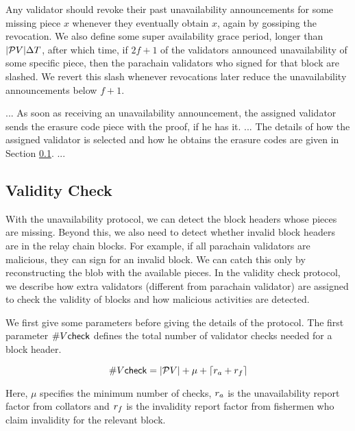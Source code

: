 Any validator should revoke their past unavailability announcements for some missing piece $x$ whenever they eventually obtain $x$, again by gossiping the revocation.  We also define some super availability grace period, longer than $|\mathcal{P}V| \Delta T$, after which time, if $2 f + 1$ of the validators announced unavailability of some specific piece, then the parachain validators who signed for that block are slashed.
We revert this slash whenever revocations later reduce the unavailability announcements below $f+1$.

...
As soon as receiving an unavailability announcement, the assigned validator sends the erasure code piece with the proof, if he has it. 
...
The details of how the assigned validator is selected and how he obtains the erasure codes are given in Section \ref{sec:validitycheck}. 
...



\subsection{Validity Check}
\label{sec:validitycheck}
With the unavailability protocol, we can detect the block headers whose pieces are missing. Beyond this, we also need to detect whether invalid block headers are in the relay chain blocks. For example, if all parachain validators are malicious, they can sign for an invalid block. We can catch this only by reconstructing the blob with the available pieces. In the validity check protocol, we describe how extra validators (different from parachain validator) are assigned to check the validity of blocks and how malicious activities are detected.


We first give some parameters before giving the details of the protocol.
The first parameter $\#V\mathsf{check}$ defines the total number of validator checks needed for a block header.

$$\#V\mathsf{check} = |\mathcal{P}V| + \mu +\lceil r_{a} + r_{f} \rceil$$

Here, $\mu$ specifies the minimum number of checks, $r_{a}$ is the unavailability report factor from collators and $r_{f}$ is the invalidity report factor from fishermen who claim invalidity for the relevant block. 







